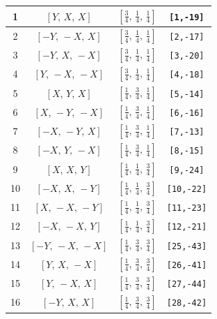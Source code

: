 \documentclass[fleqn,8pt]{jsarticle}
\begin{document}
\begin{longtable}{cccc}
1 & $\left[ Y,\, X,\, X \right]$ & $\left[ \frac{3}{4},\, \frac{1}{4},\, \frac{1}{4} \right]$ & {\tt [1,-19]} \\ \hline
2 & $\left[ - Y,\, - X,\, X \right]$ & $\left[ \frac{3}{4},\, \frac{1}{4},\, \frac{1}{4} \right]$ & {\tt [2,-17]} \\ \hline
3 & $\left[ - Y,\, X,\, - X \right]$ & $\left[ \frac{3}{4},\, \frac{1}{4},\, \frac{1}{4} \right]$ & {\tt [3,-20]} \\ \hline
4 & $\left[ Y,\, - X,\, - X \right]$ & $\left[ \frac{3}{4},\, \frac{1}{4},\, \frac{1}{4} \right]$ & {\tt [4,-18]} \\ \hline
5 & $\left[ X,\, Y,\, X \right]$ & $\left[ \frac{1}{4},\, \frac{3}{4},\, \frac{1}{4} \right]$ & {\tt [5,-14]} \\ \hline
6 & $\left[ X,\, - Y,\, - X \right]$ & $\left[ \frac{1}{4},\, \frac{3}{4},\, \frac{1}{4} \right]$ & {\tt [6,-16]} \\ \hline
7 & $\left[ - X,\, - Y,\, X \right]$ & $\left[ \frac{1}{4},\, \frac{3}{4},\, \frac{1}{4} \right]$ & {\tt [7,-13]} \\ \hline
8 & $\left[ - X,\, Y,\, - X \right]$ & $\left[ \frac{1}{4},\, \frac{3}{4},\, \frac{1}{4} \right]$ & {\tt [8,-15]} \\ \hline
9 & $\left[ X,\, X,\, Y \right]$ & $\left[ \frac{1}{4},\, \frac{1}{4},\, \frac{3}{4} \right]$ & {\tt [9,-24]} \\ \hline
10 & $\left[ - X,\, X,\, - Y \right]$ & $\left[ \frac{1}{4},\, \frac{1}{4},\, \frac{3}{4} \right]$ & {\tt [10,-22]} \\ \hline
11 & $\left[ X,\, - X,\, - Y \right]$ & $\left[ \frac{1}{4},\, \frac{1}{4},\, \frac{3}{4} \right]$ & {\tt [11,-23]} \\ \hline
12 & $\left[ - X,\, - X,\, Y \right]$ & $\left[ \frac{1}{4},\, \frac{1}{4},\, \frac{3}{4} \right]$ & {\tt [12,-21]} \\ \hline
13 & $\left[ - Y,\, - X,\, - X \right]$ & $\left[ \frac{1}{4},\, \frac{3}{4},\, \frac{3}{4} \right]$ & {\tt [25,-43]} \\ \hline
14 & $\left[ Y,\, X,\, - X \right]$ & $\left[ \frac{1}{4},\, \frac{3}{4},\, \frac{3}{4} \right]$ & {\tt [26,-41]} \\ \hline
15 & $\left[ Y,\, - X,\, X \right]$ & $\left[ \frac{1}{4},\, \frac{3}{4},\, \frac{3}{4} \right]$ & {\tt [27,-44]} \\ \hline
16 & $\left[ - Y,\, X,\, X \right]$ & $\left[ \frac{1}{4},\, \frac{3}{4},\, \frac{3}{4} \right]$ & {\tt [28,-42]} \\ \hline

\end{longtable}
\end{document}
